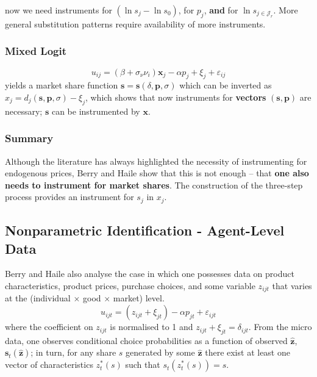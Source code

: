\documentclass[11pt]{article}
\begin{document}
now we need instruments for $(\ln s_j - \ln s_0)$, for $p_j$, \textbf{and} for $\ln s_{j \in \mathscr{J}_r}$.
More general substitution patterns require availability of more instruments.

\subsubsection{Mixed Logit}
\vspace{-.25cm}
\begin{equation}
		u_{ij} = (\beta + \sigma_{\nu}\nu_i) \mathbf{x}_j  - \alpha p_j + \xi_j + \varepsilon_{ij}
\end{equation}
yields a market share function $\bm{s} = \bm{s}(\delta, \bm{p}, \sigma)$ which can be inverted as	$x_j = d_j(\bm{s}, \bm{p}, \sigma) - \xi_j$, which shows that now instruments for \textbf{vectors} $(\bm{s,p})$ are necessary; $\bm{s}$ can be instrumented by $\bm{x}$.

\vspace{-.25cm}
\subsubsection{Summary}

Although the literature has always highlighted the necessity of instrumenting for endogenous prices, Berry and Haile show that this is not enough -- that \textbf{one also needs to instrument for market shares}. The construction of the three-step process provides an instrument for $s_j$ in $x_j$.

\subsection{Nonparametric Identification - Agent-Level Data}

Berry and Haile also analyse the case in which one possesses data on product characteristics, product prices, purchase choices, and some variable $z_{ijt}$ that varies at the (individual $\times$ good $\times$ market) level.
\vspace{-.25cm}
\begin{equation}
		u_{ijt} = (z_{ijt} + \xi_{jt}) - \alpha p_{jt} + \varepsilon_{ijt}
\end{equation}
where the coefficient on $z_{ijt}$ is normalised to 1 and $z_{ijt} + \xi_{jt} = \delta_{ijt}$. From the micro data, one observes conditional choice probabilities as a function of observed $\bm{\hat{z}}$, $\bm{s}_t(\bm{\hat{z}})$; in turn, for any share $s$ generated by some $\bm{\hat{z}}$ there exist at least one vector of characteristics $z^*_t(s)$ such that $s_t(z^*_t(s)) = s$. \\
\end{document}

